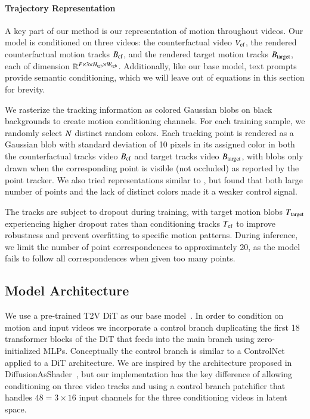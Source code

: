 \paragraph{Trajectory Representation}
A key part of our method is our representation of motion throughout videos. Our model is conditioned on three videos: the counterfactual video $V_{\text{cf}}$, the rendered counterfactual motion tracks $B_{\text{cf}}$, and the rendered target motion tracks $B_{\text{target}}$, each of dimension $\mathbb{R}^{F \times 3 \times H_{\text{rgb}} \times W_{\text{rgb}}}$. Additionally, like our base model, text prompts provide semantic conditioning, which we will leave out of equations in this section for brevity.

We rasterize the tracking information as colored Gaussian blobs on black backgrounds to create motion conditioning channels. For each training sample, we randomly select $N$ distinct random colors. Each tracking point is rendered as a Gaussian blob with standard deviation of 10 pixels in its assigned color in both the counterfactual tracks video $B_{\text{cf}}$ and target tracks video $B_{\text{target}}$, with blobs only drawn when the corresponding point is visible (not occluded) as reported by the point tracker. We also tried representations similar to \citep{das2025}, but found that both large number of points and the lack of distinct colors made it a weaker control signal.

The tracks are subject to dropout during training, with target motion blobs $T_{\text{target}}$ experiencing higher dropout rates than conditioning tracks $T_{\text{cf}}$ to improve robustness and prevent overfitting to specific motion patterns. During inference, we limit the number of point correspondences to approximately 20, as the model fails to follow all correspondences when given too many points.

\subsection{Model Architecture}
We use a pre-trained T2V DiT as our base model~\cite{cogvideox2024}. In order to condition on motion and input videos we incorporate a control branch duplicating the first 18 transformer blocks of the DiT that feeds into the main branch using zero-initialized MLPs. Conceptually the control branch is similar to a ControlNet~\cite{controlnet2023} applied to a DiT architecture. We are inspired by the architecture proposed in DiffusionAsShader~\cite{das2025}, but our implementation has the key difference of allowing conditioning on three video tracks and using a control branch patchifier that handles $48 = 3 \times 16$ input channels for the three conditioning videos in latent space.


